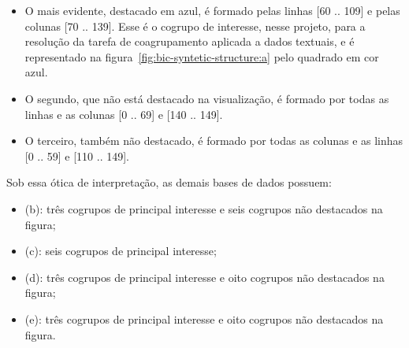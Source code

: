 \documentclass[
    12pt,                %
    oneside,            %
    a4paper,            %
    english,            %
    brazil                %
    ]{abntex2ppgsi}
\begin{document}

\begin{itemize}
\item O mais evidente, destacado em azul, é formado pelas linhas [60 .. 109] e pelas colunas [70 .. 139]. Esse é o cogrupo de interesse, nesse projeto, para a resolução da tarefa de coagrupamento aplicada a dados textuais, e é representado na figura~\ref{fig:bic-syntetic-structure:a} pelo quadrado em cor azul.
\item O segundo, que não está destacado na visualização, é formado por todas as linhas e as colunas [0 .. 69] e [140 .. 149].
\item O terceiro, também não destacado, é formado por todas as colunas e as linhas [0 .. 59] e [110 .. 149].
\end{itemize}

Sob essa ótica de interpretação, as demais bases de dados possuem:

\begin{itemize}
\item (b): três cogrupos de principal interesse e seis cogrupos não destacados na figura;
\item (c): seis cogrupos de principal interesse;
\item (d): três cogrupos de principal interesse e oito cogrupos não destacados na figura;
\item (e): três cogrupos de principal interesse e oito cogrupos não destacados na figura.
\end{itemize}



\end{document}

